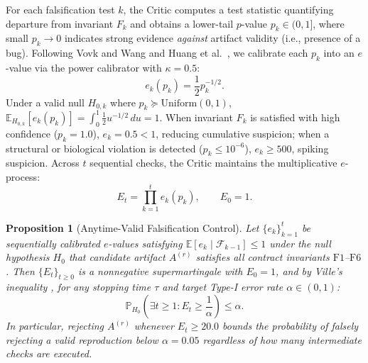 \documentclass[10pt,twocolumn]{article}
\newtheorem{proposition}{Proposition}
\begin{document}
For each falsification test $k$, the Critic computes a test statistic quantifying departure from invariant $F_k$ and obtains a lower-tail $p$-value $p_k \in (0, 1]$, where small $p_k \to 0$ indicates strong evidence \emph{against} artifact validity (i.e., presence of a bug). Following Vovk and Wang \cite{vovk2021values} and Huang et al.\ \cite{huang2025popper}, we calibrate each $p_k$ into an $e$-value via the power calibrator with $\kappa = 0.5$:
\begin{equation}
    e_k(p_k) = \frac{1}{2} p_k^{-1/2}.
    \label{eq:vovk_wang}
\end{equation}
Under a valid null $H_{0,k}$ where $p_k \succeq \text{Uniform}(0,1)$, $\mathbb{E}_{H_{0,k}}[e_k(p_k)] = \int_0^1 \frac{1}{2} u^{-1/2}\,du = 1$. When invariant $F_k$ is satisfied with high confidence ($p_k = 1.0$), $e_k = 0.5 < 1$, reducing cumulative suspicion; when a structural or biological violation is detected ($p_k \le 10^{-6}$), $e_k \ge 500$, spiking suspicion. Across $t$ sequential checks, the Critic maintains the multiplicative $e$-process:
\begin{equation}
    E_t = \prod_{k=1}^t e_k(p_k), \qquad E_0 = 1.
    \label{eq:e_process}
\end{equation}

\begin{proposition}[Anytime-Valid Falsification Control]
\label{prop:ville}
Let $\{e_k\}_{k=1}^t$ be sequentially calibrated $e$-values satisfying $\mathbb{E}[e_k \mid \mathcal{F}_{k-1}] \le 1$ under the null hypothesis $H_0$ that candidate artifact $A^{(r)}$ satisfies all contract invariants $\text{F1}$--$\text{F6}$. Then $\{E_t\}_{t \ge 0}$ is a nonnegative supermartingale with $E_0 = 1$, and by Ville's inequality \cite{ville1939etude}, for any stopping time $\tau$ and target Type-I error rate $\alpha \in (0, 1)$:
\begin{equation}
    \mathbb{P}_{H_0}\!\left(\exists t \ge 1 : E_t \ge \frac{1}{\alpha}\right) \le \alpha.
\end{equation}
In particular, rejecting $A^{(r)}$ whenever $E_t \ge 20.0$ bounds the probability of falsely rejecting a valid reproduction below $\alpha = 0.05$ regardless of how many intermediate checks are executed.
\end{proposition}
\end{document}
